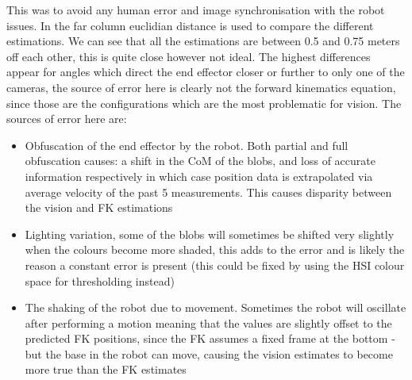 \documentclass{report}
\begin{document}
\noindent This was to avoid any human error and image synchronisation with the robot issues. In the far column euclidian distance is used to compare the different estimations. We can see that all the estimations are between 0.5 and 0.75 meters off each other, this is quite close however not ideal. The highest differences appear for angles which direct the end effector closer or further to only one of the cameras, the source of error here is clearly not the forward kinematics equation, since those are the configurations which are the most problematic for vision. The sources of error here are:
\begin{itemize}
    \item Obfuscation of the end effector by the robot. Both partial and full obfuscation causes: a shift in the CoM of the blobs, and loss of accurate information respectively in which case position data is extrapolated via average velocity of the past 5 measurements. This causes disparity between the vision and FK estimations
    \item Lighting variation, some of the blobs will sometimes be shifted very slightly when the colours become more shaded, this adds to the error and is likely the reason a constant error is present (this could be fixed by using the HSI colour space for thresholding instead)
    \item The shaking of the robot due to movement. Sometimes the robot will oscillate after performing a motion meaning that the values are slightly offset to the predicted FK positions, since the FK assumes a fixed frame at the bottom - but the base in the robot can move, causing the vision estimates to become more true than the FK estimates 
\end{itemize}
\end{document}
